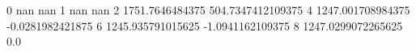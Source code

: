 0 nan nan
1 nan nan
2 1751.7646484375 504.7347412109375
4 1247.001708984375 -0.0281982421875
6 1245.935791015625 -1.0941162109375
8 1247.0299072265625 0.0

